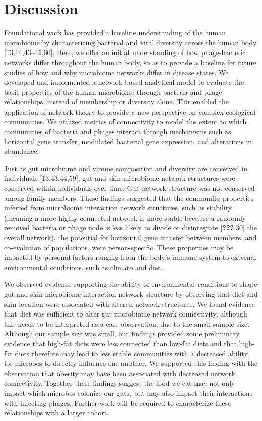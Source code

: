 \documentclass[12pt,]{article}
\begin{document}
\section{Discussion}\label{discussion}

Foundational work has provided a baseline understanding of the human
microbiome by characterizing bacterial and viral diversity across the
human body {[}13,14,43--45,60{]}. Here, we offer an initial
understanding of how phage-bacteria networks differ throughout the human
body, so as to provide a baseline for future studies of how and why
microbiome networks differ in disease states. We developed and
implemented a network-based analytical model to evaluate the basic
properties of the human microbiome through bacteria and phage
relationships, instead of membership or diversity alone. This enabled
the application of network theory to provide a new perspective on
complex ecological communities. We utilized metrics of connectivity to
model the extent to which communities of bacteria and phages interact
through mechanisms such as horizontal gene transfer, modulated bacterial
gene expression, and alterations in abundance.

Just as gut microbiome and virome composition and diversity are
conserved in individuals {[}13,43,44,59{]}, gut and skin microbiome
network structures were conserved within individuals over time. Gut
network structure was not conserved among family members. These findings
suggested that the community properties inferred from microbiome
interaction network structures, such as stability (meaning a more highly
connected network is more stable because a randomly removed bacteria or
phage node is less likely to divide or disintegrate
{[}{\textbf{???}},30{]} the overall network), the potential for
horizontal gene transfer between members, and co-evolution of
populations, were person-specific. These properties may be impacted by
personal factors ranging from the body's immune system to external
environmental conditions, such as climate and diet.

We observed evidence supporting the ability of environmental conditions
to shape gut and skin microbiome interaction network structure by
observing that diet and skin location were associated with altered
network structures. We found evidence that diet was sufficient to alter
gut microbiome network connectivity, although this needs to be
interpreted as a case observation, due to the small sample size.
Although our sample size was small, our findings provided some
preliminary evidence that high-fat diets were less connected than
low-fat diets and that high-fat diets therefore may lead to less stable
communities with a decreased ability for microbes to directly influence
one another. We supported this finding with the observation that obesity
may have been associated with decreased network connectivity. Together
these findings suggest the food we eat may not only impact which
microbes colonize our guts, but may also impact their interactions with
infecting phages. Further work will be required to characterize these
relationships with a larger cohort.
\end{document}
